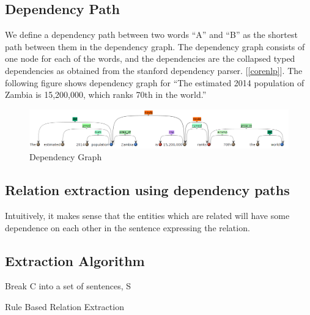 \documentclass[a4paper,10pt]{article}
\begin{document}
\subsection{Dependency Path}
We define a dependency path between two words ``A'' and ``B'' as the shortest path between them in the dependency graph.
The dependency graph consists of one node for each of the words, and the dependencies are the collapsed typed dependencies 
as obtained from the stanford dependency parser. [\ref{corenlp}]. 
The following figure shows dependency graph for ``The estimated 2014 population of Zambia is 15,200,000, which ranks 70th in the world.''
\begin{figure}
 \centering
 \includegraphics[bb=0 0 990 149, scale = 0.4]{./dep.png}
 \caption{Dependency Graph}
 \label{fig:1}
\end{figure}


\subsection{Relation extraction using dependency paths}
Intuitively, it makes sense that the entities which are related will have some dependence on each other in the sentence 
expressing the relation.

\subsection{Extraction Algorithm}
\begin{algorithm}
 Break C into a set of sentences, S\;

\caption{Rule Based Relation Extraction}
\end{algorithm}
\end{document}
